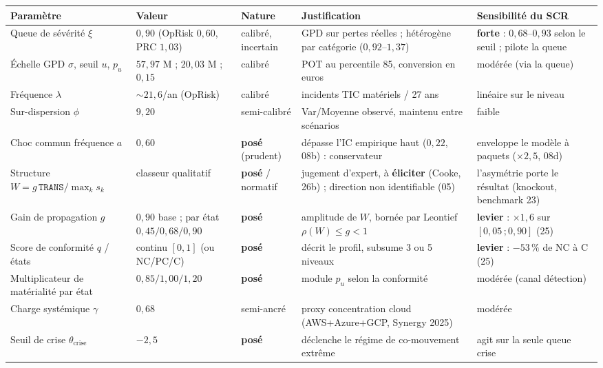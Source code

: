 \documentclass[11pt,a4paper]{article}
\providecommand{\euro}{\texteuro}
\begin{document}
\vspace{0.25cm}
\begin{center}\footnotesize
\renewcommand{\arraystretch}{1.28}
\begin{tabular}{@{}p{2.7cm} p{2.6cm} p{1.7cm} p{4.0cm} p{3.6cm}@{}}
\toprule
\textbf{Paramètre} & \textbf{Valeur} & \textbf{Nature} & \textbf{Justification} & \textbf{Sensibilité du SCR} \\
\midrule
Queue de sévérité $\xi$ & $0{,}90$ (OpRisk $0{,}60$, PRC $1{,}03$) & calibré, incertain & GPD sur pertes réelles ; hétérogène par catégorie ($0{,}92$--$1{,}37$) & \textbf{forte} : $0{,}68$--$0{,}93$ selon le seuil ; pilote la queue \\
Échelle GPD $\sigma$, seuil $u$, $p_u$ & $57{,}97$ M\euro{} ; $20{,}03$ M\euro{} ; $0{,}15$ & calibré & POT au percentile 85, conversion en euros & modérée (via la queue) \\
Fréquence $\lambda$ & ${\sim}21{,}6$/an (OpRisk) & calibré & incidents TIC matériels / 27 ans & linéaire sur le niveau \\
Sur-dispersion $\phi$ & $9{,}20$ & semi-calibré & Var/Moyenne observé, maintenu entre scénarios & faible \\
Choc commun fréquence $a$ & $0{,}60$ & \textbf{posé} (prudent) & dépasse l'IC empirique haut ($0{,}22$, 08b) : conservateur & enveloppe le modèle à paquets ($\times 2{,}5$, 08d) \\
Structure $W = g\,\texttt{TRANS}/\max_k s_k$ & classeur qualitatif & \textbf{posé} / normatif & jugement d'expert, à \textbf{éliciter} (Cooke, 26b) ; direction non identifiable (05) & l'asymétrie porte le résultat (knockout, benchmark 23) \\
Gain de propagation $g$ & $0{,}90$ base ; par état $0{,}45/0{,}68/0{,}90$ & \textbf{posé} & amplitude de $W$, bornée par Leontief $\rho(W)\le g<1$ & \textbf{levier} : $\times 1{,}6$ sur $[0{,}05\,;0{,}90]$ (25) \\
Score de conformité $q$ / états & continu $[0,1]$ (ou NC/PC/C) & \textbf{posé} & décrit le profil, subsume 3 ou 5 niveaux & \textbf{levier} : $-53\,\%$ de NC à C (25) \\
Multiplicateur de matérialité par état & $0{,}85/1{,}00/1{,}20$ & \textbf{posé} & module $p_u$ selon la conformité & modérée (canal détection) \\
Charge systémique $\gamma$ & $0{,}68$ & semi-ancré & proxy concentration cloud (AWS+Azure+GCP, Synergy 2025) & modérée \\
Seuil de crise $\theta_{\text{crise}}$ & $-2{,}5$ & \textbf{posé} & déclenche le régime de co-mouvement extrême & agit sur la seule queue crise \\

\end{tabular}
\end{center}
\end{document}
